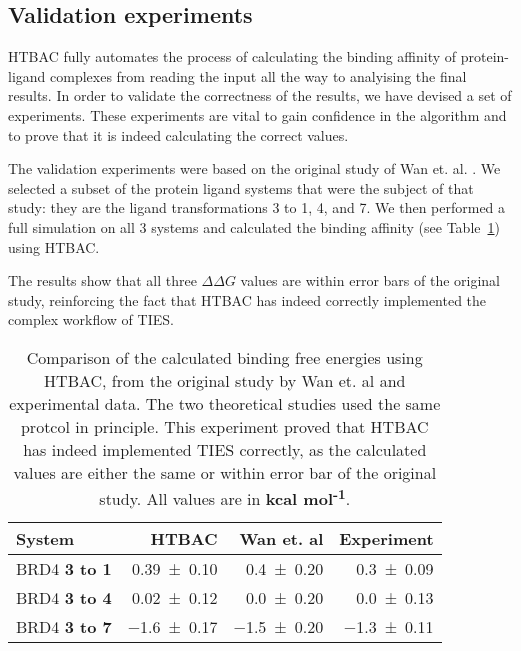 
\subsection{Validation experiments}

HTBAC fully automates the process of calculating the binding affinity of
protein-ligand complexes from reading the input all the way to analyising the
final results. In order to validate the correctness of the results, we have
devised a set of experiments. These experiments are vital to gain confidence
in the algorithm and to prove that it is indeed calculating the correct values.

The validation experiments were based on the original study of Wan et. al.
\cite{Wan2017brd4}. We selected a subset of the protein ligand systems that
were the subject of that study: they are the ligand transformations 3 to 1, 4,
and 7. We then performed a full simulation on all 3 systems and calculated the
binding affinity (see Table~\ref{tab:exp2}) using HTBAC.

The results show that all three $\Delta \Delta G$ values are within error bars
of the original study, reinforcing the fact that HTBAC has indeed correctly
implemented the complex workflow of TIES.

\begin{table}
  \centering
  \begin{tabular}{l@{\hskip 1in}r@{\hskip 0.2in}r@{\hskip 0.2in}r}
    \toprule
    System & HTBAC & Wan et. al & Experiment \\
    \midrule
    BRD4 \textbf{3 to 1} & \num{0.39 +- 0.10} &   \num{0.4 +- 0.20} &  \num{0.3 +- 0.09} \\
    BRD4 \textbf{3 to 4} & \num{0.02 +- 0.12} &   \num{0.0 +- 0.20} &  \num{0.0 +- 0.13} \\
    BRD4 \textbf{3 to 7} & \num{-1.6 +- 0.17} &  \num{-1.5 +- 0.20} & \num{-1.3 +- 0.11} \\
    \bottomrule
  \end{tabular}

  \caption{Comparison of the calculated binding free energies using HTBAC, from
  the original study by Wan et. al and experimental data. The two theoretical
  studies used the same protcol in principle. This experiment proved that HTBAC
  has indeed implemented TIES correctly, as the calculated values are either
  the same or within error bar of the original study. All values are in
  \textbf{kcal mol\textsuperscript{-1}}.}
  \label{tab:exp2}


\end{table}

